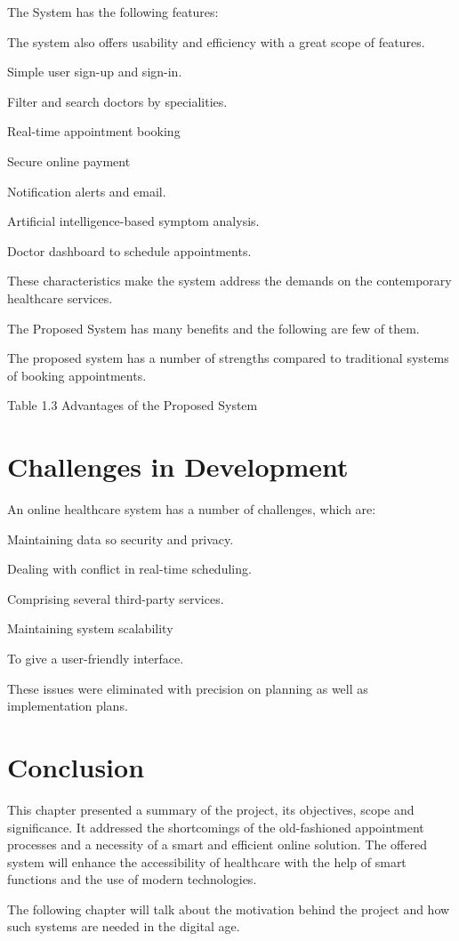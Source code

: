 The System has the following features:

The system also offers usability and efficiency with a great scope of features.

Simple user sign-up and sign-in.

Filter and search doctors by specialities.

Real-time appointment booking

Secure online payment

Notification alerts and email.

Artificial intelligence-based symptom analysis.

Doctor dashboard to schedule appointments.

These characteristics make the system address the demands on the contemporary healthcare services.

The Proposed System has many benefits and the following are few of them.

The proposed system has a number of strengths compared to traditional systems of booking appointments.

Table 1.3 Advantages of the Proposed System

\section{Challenges in Development}

An online healthcare system has a number of challenges, which are:

Maintaining data so security and privacy.

Dealing with conflict in real-time scheduling.

Comprising several third-party services.

Maintaining system scalability

To give a user-friendly interface.

These issues were eliminated with precision on planning as well as implementation plans.

\section{Conclusion}

This chapter presented a summary of the project, its objectives, scope and significance. It addressed the shortcomings of the old-fashioned appointment processes and a necessity of a smart and efficient online solution. The offered system will enhance the accessibility of healthcare with the help of smart functions and the use of modern technologies.

The following chapter will talk about the motivation behind the project and how such systems are needed in the digital age.
